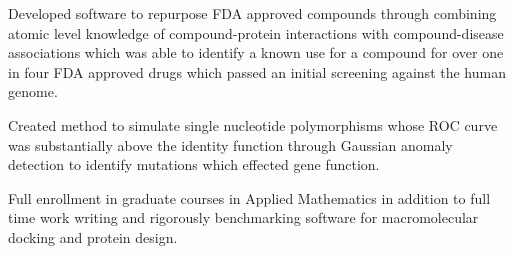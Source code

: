 \documentclass[letterpaper]{deedy-resume} %
\begin{document}
\begin{minipage}[t]{0.66\textwidth}


\begin{tightitemize}
\item Developed software to repurpose FDA approved compounds through combining atomic level knowledge of compound-protein interactions with compound-disease associations  which was able to identify a known use for a compound for over one in four FDA approved drugs which passed an initial screening against the human genome.
\end{tightitemize}

\sectionspace %



\begin{tightitemize}
\item Created method to simulate single nucleotide polymorphisms whose ROC curve was substantially above the identity function through Gaussian anomaly detection to identify mutations which effected gene function.
\item Full enrollment in graduate courses in Applied Mathematics in addition to full time work writing and rigorously benchmarking software for macromolecular docking and protein design.
\end{tightitemize}

\sectionspace %





\end{minipage}
\end{document}
